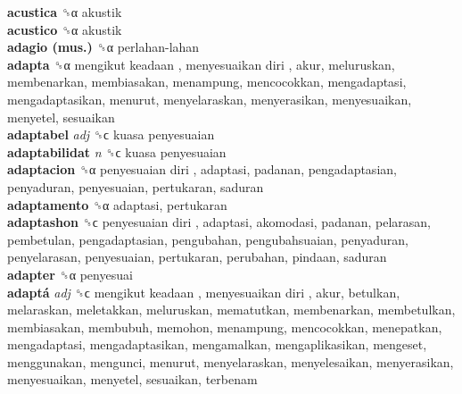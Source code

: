 \textbf{acustica} ␝α  akustik  \\
\textbf{acustico} ␝α  akustik  \\
\textbf{adagio (mus.)} ␝α   perlahan-lahan   \\
\textbf{adapta} ␝α   mengikut keadaan ,  menyesuaikan diri , akur, meluruskan, membenarkan, membiasakan, menampung, mencocokkan, mengadaptasi, mengadaptasikan, menurut, menyelaraskan, menyerasikan, menyesuaikan, menyetel, sesuaikan  \\
\textbf{adaptabel} \emph{adj}  ␝ϲ   kuasa penyesuaian   \\
\textbf{adaptabilidat} \emph{n}  ␝ϲ   kuasa penyesuaian   \\
\textbf{adaptacion} ␝α   penyesuaian diri , adaptasi, padanan, pengadaptasian, penyaduran, penyesuaian, pertukaran, saduran  \\
\textbf{adaptamento} ␝α  adaptasi, pertukaran  \\
\textbf{adaptashon} ␝ϲ   penyesuaian diri , adaptasi, akomodasi, padanan, pelarasan, pembetulan, pengadaptasian, pengubahan, pengubahsuaian, penyaduran, penyelarasan, penyesuaian, pertukaran, perubahan, pindaan, saduran  \\
\textbf{adapter} ␝α  penyesuai  \\
\textbf{adaptá} \emph{adj}  ␝ϲ   mengikut keadaan ,  menyesuaikan diri , akur, betulkan, melaraskan, meletakkan, meluruskan, mematutkan, membenarkan, membetulkan, membiasakan, membubuh, memohon, menampung, mencocokkan, menepatkan, mengadaptasi, mengadaptasikan, mengamalkan, mengaplikasikan, mengeset, menggunakan, mengunci, menurut, menyelaraskan, menyelesaikan, menyerasikan, menyesuaikan, menyetel, sesuaikan, terbenam  \\
